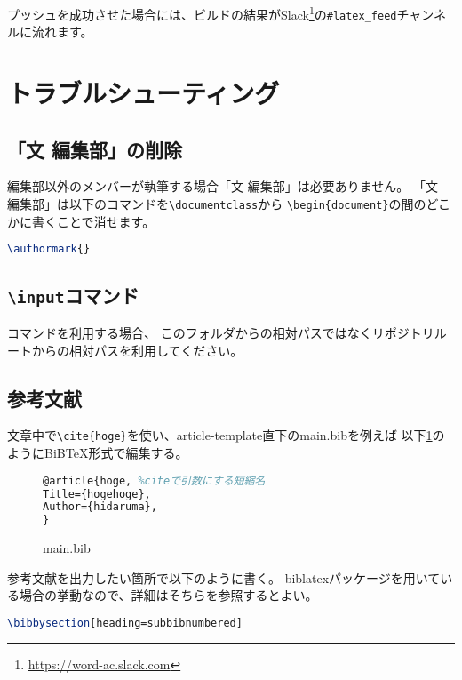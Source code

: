 \documentclass[../../main]{subfiles}
\begin{document}
プッシュを成功させた場合には、ビルドの結果がSlack\footnote{\url{https://word-ac.slack.com}}の\texttt{\#latex\_feed}チャンネルに流れます。

\section{トラブルシューティング}

\subsection{「文 編集部」の削除}

編集部以外のメンバーが執筆する場合「文 編集部」は必要ありません。
「文　編集部」は以下のコマンドを\lstinline|\documentclass|から
\lstinline|\begin{document}|の間のどこかに書くことで消せます。

\begin{lstlisting}[language=TeX, mathescape]
\authormark{}    
\end{lstlisting}

\subsection{\texttt{\textbackslash input}コマンド}

\lstinline||コマンドを利用する場合、
このフォルダからの相対パスではなくリポジトリルートからの相対パスを利用してください。

\subsection{参考文献}
文章中で\lstinline$\cite{hoge}$を使い、article-template直下のmain.bibを例えば
以下\ref{bibtex}のようにBiB\TeX 形式で編集する。

\begin{figure}
\begin{lstlisting}[language=TeX, mathescape,]
@article{hoge, %citeで引数にする短縮名
Title={hogehoge},
Author={hidaruma},
}
\end{lstlisting}
\label{bibtex}
\caption{main.bib}
\end{figure}
参考文献を出力したい箇所で以下のように書く。
biblatexパッケージを用いている場合の挙動なので、詳細はそちらを参照するとよい。
\begin{lstlisting}[language=TeX, mathescape]
\bibbysection[heading=subbibnumbered]
\end{lstlisting}
\end{document}
